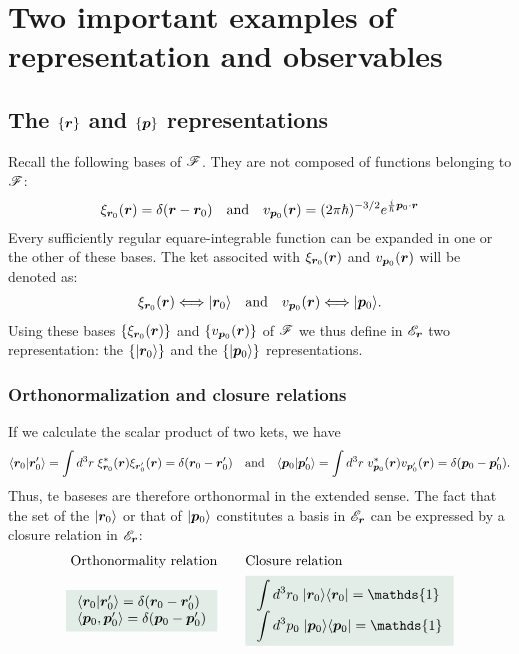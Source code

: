 \section{Two important examples of representation and observables}
\subsection{The $\{\bm{r}\}$ and $\{\bm{p}\}$ representations}

Recall the following bases of $\mathscr{F}$. They are not composed of functions belonging to $\mathscr{F}$:
\begin{align}
    \xi_{\bm{r}_0}(\bm{r})=\delta(\bm{r}-\bm{r}_0)\quad\text{and}\quad v_{\bm{p}_0}(\bm{r})=(2\pi\hbar)^{-3/2}e^{\frac{i}{\hbar}\bm{p}_0\cdot\bm{r}}
\end{align}
Every sufficiently regular equare-integrable function can be expanded in one or the other of these bases.
The ket associted with $\xi_{\bm{r}_0}(\bm{r})$ and $v_{\bm{p}_0}(\bm{r})$ will be denoted as:
\begin{align}
    \xi_{\bm{r}_0}(\bm{r})\Longleftrightarrow|\bm{r}_0\rangle\quad\text{and}\quad v_{\bm{p}_0}(\bm{r})\Longleftrightarrow|\bm{p}_0\rangle.
\end{align}
Using these bases $\{\xi_{\bm{r}_0}(\bm{r})\}$ and $\{v_{\bm{p}_0}(\bm{r})\}$ of $\mathscr{F}$ we thus define in $\mathscr{E}_{\bm{r}}$ two representation:
the $\{|\bm{r}_0\rangle\}$ and the $\{|\bm{p}_0\rangle\}$ representations.
%
\subsubsection{Orthonormalization and closure relations}
If we calculate the scalar product of two kets, we have
\begin{align*}
    \langle\bm{r}_0|\bm{r}_0'\rangle=\int d^3r\;\xi^*_{\bm{r}_0}(\bm{r})\xi_{\bm{r}'_0}(\bm{r})=\delta(\bm{r}_0-\bm{r}_0')\quad\text{and}\quad\langle\bm{p}_0|\bm{p}_0'\rangle=\int d^3r\;v^*_{\bm{p}_0}(\bm{r})
    v_{\bm{p}'_0}(\bm{r})=\delta(\bm{p}_0-\bm{p}_0').
\end{align*}
Thus, te baseses are therefore orthonormal in the extended sense. The fact that the set of the $|\bm{r}_0\rangle$ or that of $|\bm{p}_0\rangle$ constitutes a basis in $\mathscr{E}_{\bm{r}}$
can be expressed by a closure relation in $\mathscr{E}_{\bm{r}}$:
\begin{align}
    \text{Orthonormality relation}&\qquad\text{Closure relation}\\
    \highlight{\begin{array}{l}
        \braket{\bR_0|\bR_0'}=\delta(\bR_0-\bR_0')\\
        \braket{\bp_0,\bp_0'}=\delta(\bp_0-\bp_0')
    \end{array}}&\qquad\highlight{\begin{array}{l}
        \displaystyle\int d^3r_0\;\ket{\bR_0}\bra{\bR_0}=\mathds{1}\\
        \displaystyle\int d^3p_0\;\ket{\bp_0}\bra{\bp_0}=\mathds{1}
    \end{array}}
\end{align}
%
